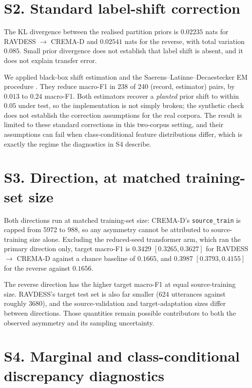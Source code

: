 \documentclass[a4paper,fleqn]{cas-dc}
\begin{document}
\section*{S2. Standard label-shift correction}
\label{sec:s-labelshift}

The KL divergence between the realised partition priors is $0.02235$ nats for
RAVDESS $\rightarrow$ CREMA-D and $0.02541$ nats for the reverse, with total
variation $0.085$. Small prior divergence does not establish that label shift is
absent, and it does not explain transfer error.

We applied black-box shift estimation and the
Saerens--Latinne--Decaestecker EM procedure
\cite{lipton2018bbse,saerens2002adjusting}. They reduce macro-F1 in 238 of 240
(record, estimator) pairs, by $0.013$ to $0.24$ macro-F1. Both estimators
recover a \emph{planted} prior shift to within $0.05$ under test, so the
implementation is not simply broken; the synthetic check does not establish the
correction assumptions for the real corpora. The result is limited to these
standard corrections in this two-corpus setting, and their assumptions can fail
when class-conditional feature distributions differ, which is exactly the regime
the diagnostics in S4 describe.

\section*{S3. Direction, at matched training-set size}
\label{sec:s-direction}

Both directions run at matched training-set size: CREMA-D's
\texttt{source\_train} is capped from 5972 to 988, so any asymmetry cannot be
attributed to source-training size alone. Excluding the reduced-seed transformer
arm, which ran the primary direction only, target macro-F1 is $0.3429$
$[0.3265, 0.3627]$ for RAVDESS $\rightarrow$ CREMA-D against a chance baseline
of $0.1665$, and $0.3987$ $[0.3793, 0.4155]$ for the reverse against $0.1656$.

The reverse direction has the higher target macro-F1 at equal source-training
size. RAVDESS's target test set is also far smaller (624 utterances against
roughly 3680), and the source-validation and target-adaptation sizes differ
between directions. Those quantities remain possible contributors to both the
observed asymmetry and its sampling uncertainty.

\section*{S4. Marginal and class-conditional discrepancy diagnostics}
\label{sec:s-decomposition}
\end{document}
